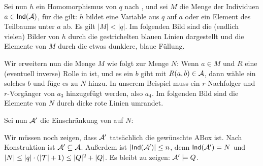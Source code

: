 \documentclass[fontsize=11pt, twoside=false, numbers=autoenddot]{scrbook}
\begin{document}
Sei nun $h$ ein Homomorphismus von $q$ nach \Umc,
und sei $M$ die Menge der Individuen $a \in \textsf{Ind}(\mathcal{A})$,
für die gilt: $h$ bildet eine Variable aus $q$
auf $a$ oder ein Element des Teilbaums unter $a$ ab.
Es gilt $|M| < |q|$.
Im folgenden Bild sind die (endlich vielen) Bilder von $h$
durch die gestrichelten blauen Linien dargestellt
und die Elemente von $M$ durch die etwas dunklere, blaue Füllung.
%
\begin{center}
\end{center}
%
Wir erweitern nun die Menge $M$ wie folgt zur Menge $N$:
Wenn $a \in M$ und $R$ eine (eventuell inverse) Rolle in \Tmc ist,
und es ein $b$ gibt mit $R(a,b) \in \mathcal{A}$, dann wähle ein solches $b$
und füge es zu $N$ hinzu.
In unserem Beispiel muss ein $r$-Nachfolger und $r$-Vorgänger von $a_3$
hinzugefügt werden, also $a_4$.
Im folgenden Bild sind die Elemente von $N$ durch 
dicke rote Linien umrandet.
%
\begin{center}
\end{center}
%
Sei nun $\mathcal{A}'$ die Einschränkung von \Amc auf $N$:
%
\begin{center}
\end{center}
%
Wir müssen noch zeigen, dass $\mathcal{A}'$ tatsächlich die gewünschte ABox ist.
Nach Konstruktion ist $\mathcal{A}' \subseteq \mathcal{A}$.
Außerdem ist $|\textsf{Ind}(\mathcal{A}')| \leq n$,
denn $\textsf{Ind}(\mathcal{A}') = N$ und
$|N| \leq |q| \cdot (|\mathcal{T}| + 1) \leq |Q|^2 + |Q|$.
Es bleibt zu zeigen: $\mathcal{A}' \models Q$.
\end{document}
